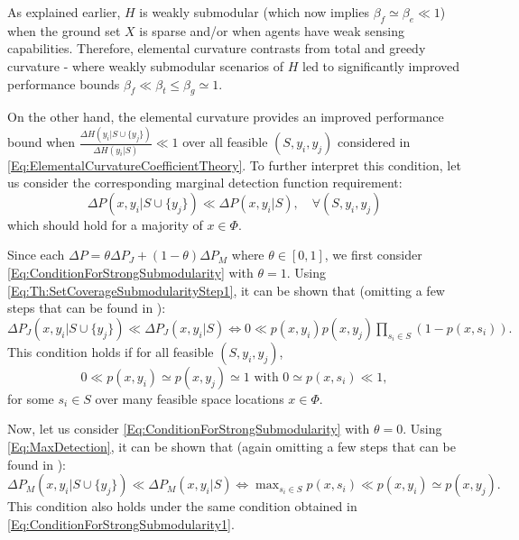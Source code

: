 \documentclass[letterpaper, 10 pt, conference]{ieeeconf}
\begin{document}

As explained earlier, $H$ is weakly submodular (which now implies $\beta_f \simeq \beta_e \ll 1$) when the ground set $X$ is sparse and/or when agents have weak sensing capabilities. Therefore, elemental curvature contrasts from total and greedy curvature - where weakly submodular scenarios of $H$ led to significantly improved performance bounds $\beta_f \ll \beta_t \leq \beta_g \simeq 1$.



On the other hand, the elemental curvature provides an improved performance bound when $\frac{\Delta H(y_i \vert S \cup \{y_j\})}{\Delta H(y_i \vert S)} \ll 1$ over all feasible $(S,y_i,y_j)$ considered in \eqref{Eq:ElementalCurvatureCoefficientTheory}. To further interpret this condition, let us consider the corresponding marginal detection function requirement:
\begin{equation}\label{Eq:ConditionForStrongSubmodularity}
\Delta P(x,y_i \vert S \cup \{y_j\}) \ll \Delta P(x, y_i \vert S), \quad \forall (S,y_i,y_j)    
\end{equation}
which should hold for a majority of $x\in\Phi$. 

Since each $\Delta P = \theta \Delta P_J + (1-\theta)\Delta P_M$ where $\theta \in [0,1]$, we first consider \eqref{Eq:ConditionForStrongSubmodularity} with $\theta = 1$. Using \eqref{Eq:Th:SetCoverageSubmodularityStep1}, it can be shown that (omitting a few steps that can be found in \cite{Welikala2024Ax1}):
$\Delta P_J(x,y_i \vert S \cup \{y_j\}) \ll \Delta P_J(x, y_i \vert S)
\iff 0 \ll p(x,y_i)p(x,y_j)\prod_{s_i\in S}(1-p(x,s_i)).
$
This condition holds if for all feasible $(S,y_i,y_j)$, 
\begin{equation}\label{Eq:ConditionForStrongSubmodularity1}
    0 \ll p(x,y_i) \simeq p(x,y_j) \simeq 1 \mbox{ with } 0 \simeq p(x,s_i) \ll 1,
\end{equation}
for some $s_i\in S$ over many feasible space locations $x\in\Phi$.

Now, let us consider \eqref{Eq:ConditionForStrongSubmodularity} with $\theta = 0$. Using \eqref{Eq:MaxDetection}, it can be shown that (again omitting a few steps that can be found in \cite{Welikala2024Ax1}):  
$\Delta P_M(x,y_i \vert S \cup \{y_j\}) \ll \Delta P_M(x, y_i \vert S) \iff \max_{s_i \in S} p(x,s_i) \ll p(x,y_i) \simeq p(x,y_j).$ 
This condition also holds under the same condition obtained in \eqref{Eq:ConditionForStrongSubmodularity1}.
\end{document}
